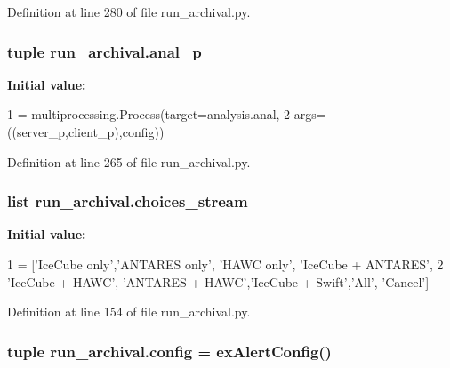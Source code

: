 Definition at line 280 of file run\-\_\-archival.\-py.

\hypertarget{namespacerun__archival_ae9e6113a713c17cde32e43834a99436a}{
\subsubsection[{anal\-\_\-p}]{\setlength{\rightskip}{0pt plus 5cm}tuple run\-\_\-archival.\-anal\-\_\-p}}\label{namespacerun__archival_ae9e6113a713c17cde32e43834a99436a}
{\bfseries Initial value\-:}
\begin{DoxyCode}
1 = multiprocessing.Process(target=analysis.anal,
2                     args=((server\_p,client\_p),config))
\end{DoxyCode}


Definition at line 265 of file run\-\_\-archival.\-py.

\hypertarget{namespacerun__archival_a18e24cc5c90db59c1cff4c0f69f82fa6}{
\subsubsection[{choices\-\_\-stream}]{\setlength{\rightskip}{0pt plus 5cm}list run\-\_\-archival.\-choices\-\_\-stream}}\label{namespacerun__archival_a18e24cc5c90db59c1cff4c0f69f82fa6}
{\bfseries Initial value\-:}
\begin{DoxyCode}
1 = [\textcolor{stringliteral}{'IceCube only'},\textcolor{stringliteral}{'ANTARES only'}, \textcolor{stringliteral}{'HAWC only'}, \textcolor{stringliteral}{'IceCube + ANTARES'},
2                     \textcolor{stringliteral}{'IceCube + HAWC'}, \textcolor{stringliteral}{'ANTARES + HAWC'},\textcolor{stringliteral}{'IceCube + Swift'},\textcolor{stringliteral}{'All'}, \textcolor{stringliteral}{'Cancel'}]
\end{DoxyCode}


Definition at line 154 of file run\-\_\-archival.\-py.

\hypertarget{namespacerun__archival_abe42e5e247442fb2afd7c8aa5322cd5f}{
\subsubsection[{config}]{\setlength{\rightskip}{0pt plus 5cm}tuple run\-\_\-archival.\-config = ex\-Alert\-Config()}}\label{namespacerun__archival_abe42e5e247442fb2afd7c8aa5322cd5f}


